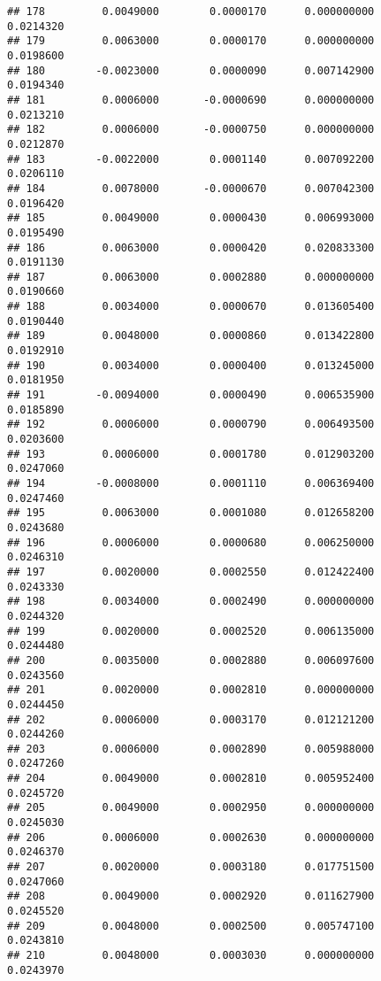 \documentclass[
]{article}
\begin{document}
\begin{verbatim}
## 178         0.0049000        0.0000170      0.000000000             0.0214320
## 179         0.0063000        0.0000170      0.000000000             0.0198600
## 180        -0.0023000        0.0000090      0.007142900             0.0194340
## 181         0.0006000       -0.0000690      0.000000000             0.0213210
## 182         0.0006000       -0.0000750      0.000000000             0.0212870
## 183        -0.0022000        0.0001140      0.007092200             0.0206110
## 184         0.0078000       -0.0000670      0.007042300             0.0196420
## 185         0.0049000        0.0000430      0.006993000             0.0195490
## 186         0.0063000        0.0000420      0.020833300             0.0191130
## 187         0.0063000        0.0002880      0.000000000             0.0190660
## 188         0.0034000        0.0000670      0.013605400             0.0190440
## 189         0.0048000        0.0000860      0.013422800             0.0192910
## 190         0.0034000        0.0000400      0.013245000             0.0181950
## 191        -0.0094000        0.0000490      0.006535900             0.0185890
## 192         0.0006000        0.0000790      0.006493500             0.0203600
## 193         0.0006000        0.0001780      0.012903200             0.0247060
## 194        -0.0008000        0.0001110      0.006369400             0.0247460
## 195         0.0063000        0.0001080      0.012658200             0.0243680
## 196         0.0006000        0.0000680      0.006250000             0.0246310
## 197         0.0020000        0.0002550      0.012422400             0.0243330
## 198         0.0034000        0.0002490      0.000000000             0.0244320
## 199         0.0020000        0.0002520      0.006135000             0.0244480
## 200         0.0035000        0.0002880      0.006097600             0.0243560
## 201         0.0020000        0.0002810      0.000000000             0.0244450
## 202         0.0006000        0.0003170      0.012121200             0.0244260
## 203         0.0006000        0.0002890      0.005988000             0.0247260
## 204         0.0049000        0.0002810      0.005952400             0.0245720
## 205         0.0049000        0.0002950      0.000000000             0.0245030
## 206         0.0006000        0.0002630      0.000000000             0.0246370
## 207         0.0020000        0.0003180      0.017751500             0.0247060
## 208         0.0049000        0.0002920      0.011627900             0.0245520
## 209         0.0048000        0.0002500      0.005747100             0.0243810
## 210         0.0048000        0.0003030      0.000000000             0.0243970

\end{verbatim}
\end{document}
